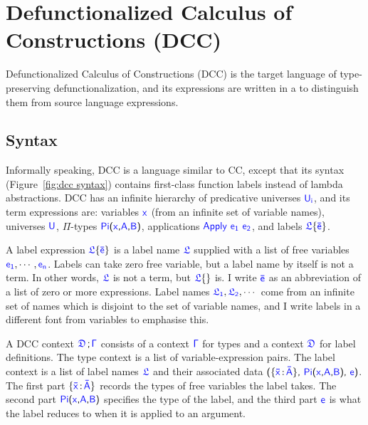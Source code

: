 
\section{Defunctionalized Calculus of\\Constructions (DCC)}

Defunctionalized Calculus of Constructions (DCC) is the target language of type-preserving defunctionalization, and its expressions are written in a  \color{black} to distinguish them from source language expressions. 

\subsection{Syntax}
Informally speaking, DCC is a language similar to CC, except that its syntax (Figure~\ref{fig:dcc syntax}) contains first-class function labels instead of lambda abstractions.
DCC has an infinite hierarchy of predicative universes $\target{U_i}$, and its term expressions are: variables $\target{x}$ (from an infinite set of variable names), universes $\target{U}$, $\Pi$-types $\targetpi{x}{A}{B}$, applications $\targetapp{e_1}{e_2}$, and labels $\targetlab{\flabel}{\bar{e}}$.

A label expression $\targetlab{\flabel}{\bar{e}}$ is a label name $\target{\flabel}$ supplied with a list of free variables $\target{e_1}, \cdots, \target{e_n}$. Labels can take zero free variable, but a label name by itself is not a term. In other words, $\target{\flabel}$ is not a term, but $\targetlab{\flabel}{}$ is. I write $\target{\bar{e}}$ as an abbreviation of a list of zero or more expressions. Label names $\target{\flabel_1}, \target{\flabel_2}, \cdots$ come from an infinite set of names which is disjoint to the set of variable names, and I write labels in a different font from variables to emphasise this.

A DCC context $\targetcon$ consists of a context $\target{\Gamma}$ for types and a context $\target{\fdef}$ for label definitions. The type context is a list of variable-expression pairs. The label context is a list of label names $\target{\flabel}$ and their associated data 
$\textsf{(}\{\itemtype{\bar{x}}{\bar{A}}\}\textsf{,}\ \targetpi{x}{A}{B} \textsf{,}\ \target{e} \textsf{)}$. 
The first part $\{\itemtype{\bar{x}}{\bar{A}}\}$ records the types of free variables the label takes. 
The second part $\targetpi{x}{A}{B}$ specifies the type of the label, and the third part $\target{e}$ is what the label reduces to when it is applied to an argument.

